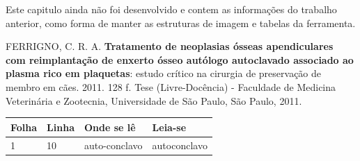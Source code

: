 
Este capitulo ainda não foi desenvolvido e contem as informações do trabalho anterior, como forma de manter as estruturas de imagem e tabelas da ferramenta.






\noindent FERRIGNO, C. R. A. \textbf{Tratamento de neoplasias ósseas apendiculares com reimplantação de enxerto ósseo autólogo autoclavado associado ao plasma rico em plaquetas}: estudo crítico na cirurgia de preservação de membro em cães. 2011. 128 f. Tese (Livre-Docência) - Faculdade de Medicina Veterinária e Zootecnia, Universidade de São Paulo, São Paulo, 2011.

\begin{table}[h!]
	\center
	\begin{tabular}{|p{1.4cm}|p{1cm}|p{3cm}|p{3cm}|}
		\hline
		\textbf{Folha} & \textbf{Linha} & \textbf{Onde se lê} &
		\textbf{Leia-se}\\
		\hline
		1 & 10 & auto-conclavo & autoconclavo\\
		\hline
	\end{tabular}
\end{table}
